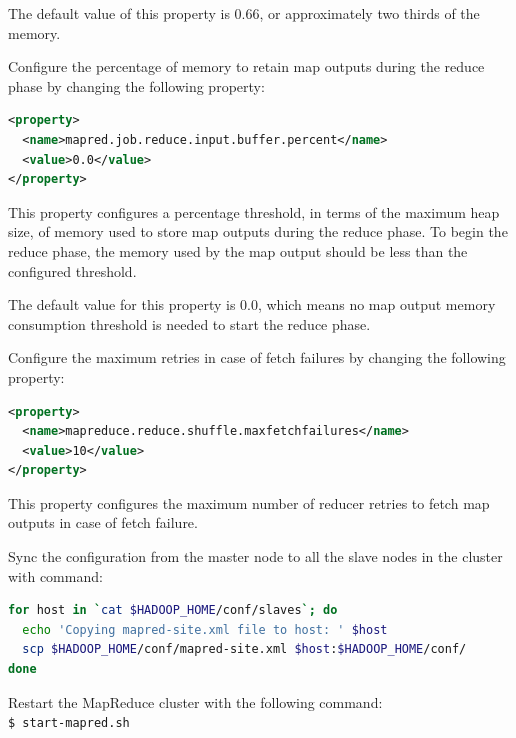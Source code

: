 The default value of this property is 0.66, or approximately two thirds of the memory.

Configure the percentage of memory to retain map outputs during the reduce phase by changing the following property:
\lstset{style=bashstyle}
\begin{lstlisting}[language=XML]
<property>
  <name>mapred.job.reduce.input.buffer.percent</name>
  <value>0.0</value>
</property>
\end{lstlisting}
This property configures a percentage threshold, in terms of the maximum heap size, of memory used to store map outputs during the reduce phase. To begin the reduce phase, the memory used by the map output should be less than the configured threshold.

The default value for this property is 0.0, which means no map output memory consumption threshold is needed to start the reduce phase.

Configure the maximum retries in case of fetch failures by changing the following property:
\lstset{style=bashstyle}
\begin{lstlisting}[language=XML]
<property>
  <name>mapreduce.reduce.shuffle.maxfetchfailures</name>
  <value>10</value>
</property>
\end{lstlisting}

This property configures the maximum number of reducer retries to fetch map outputs in case of fetch failure.

Sync the configuration from the master node to all the slave nodes in the cluster with command:
\lstset{style=bashstyle}
\begin{lstlisting}[language=bash]
for host in `cat $HADOOP_HOME/conf/slaves`; do
  echo 'Copying mapred-site.xml file to host: ' $host
  scp $HADOOP_HOME/conf/mapred-site.xml $host:$HADOOP_HOME/conf/
done
\end{lstlisting}

Restart the MapReduce cluster with the following command: \\
\verb|$ start-mapred.sh|

